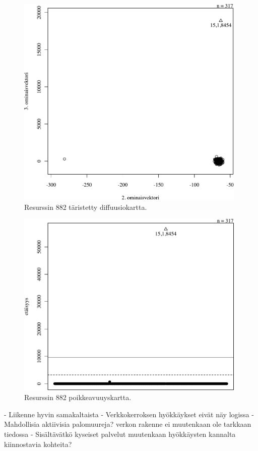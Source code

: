 \begin{figure}[p]
\centering
\includegraphics[width=11cm]{pics/diffuusiokuvat/service_882.pdf}
\caption{Resurssin 882 täristetty diffuusiokartta.}
\label{diffusio_882}
\end{figure}

\begin{figure}[p]
\centering
\includegraphics[width=11cm]{pics/tiheyskuvat/service_882.pdf}
\caption{Resurssin 882 poikkeavuuyskartta.}
\label{service_882}
\end{figure}

- Liikenne hyvin samakaltaista
- Verkkokerroksen hyökkäykset eivät näy logissa
- Mahdollisia aktiivisia palomuureja? verkon rakenne ei muutenkaan ole tarkkaan tiedossa
- Sisältävätkö kyseiset palvelut muutenkaan hyökkäysten kannalta kiinnostavia kohteita?


